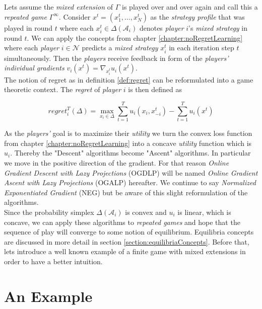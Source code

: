 Lets assume the \textit{mixed extension} of $\Gamma$ is played over and over again and call this a \textit{repeated game} $\Gamma^{\infty}$. Consider $x^t = (x_{1}^{t},\dots,x_{N}^{t})$ as the \textit{strategy profile} that was played in round $t$ where each $x_{i}^{t} \in \Delta(\mathcal{A}_i)$ denotes \textit{player} $i$'s \textit{mixed strategy} in round $t$. We can apply the concepts from chapter \ref{chapter:noRegretLearning} where each \textit{player} $i \in \mathcal{N}$ predicts a \textit{mixed strategy} $x_{i}^{t}$ in each iteration step $t$ simultaneously. Then the \textit{players} receive feedback in form of the  \textit{players' individual gradients} $v_{i}(x^t) = \nabla_{x_{i}^{t}}u_{i}(x^t)$. \\

The notion of regret as in definition \ref{def:regret} can be reformulated into a game theoretic context. The \textit{regret} of \textit{player} $i$ is then defined as

\begin{equation*}
    regret_{i}^{T}(\Delta) = \max_{x_i \in \Delta}\sum_{t=1}^{T} u_i(x_i,x_{-i}^{t}) - \sum_{t=1}^{T}u_i(x^t)
\end{equation*}

As the \textit{players'} goal is to maximize their \textit{utility} we turn the convex loss function from chapter \ref{chapter:noRegretLearning} into a concave \textit{utility} function which is $u_i$. Thereby the "Descent" algorithms become "Ascent" algorithms. In particular we move in the positive direction of the gradient. For that reason \textit{Online Gradient Descent with Lazy Projections} (OGDLP) will be named \textit{Online Gradient Ascent with Lazy Projections} (OGALP) hereafter. We continue to say \textit{Normalized Exponentiated Gradient} (NEG) but be aware of this slight reformulation of the algorithms. \\

Since the probability simplex $\Delta(\mathcal{A}_i)$ is convex and $u_i$ is linear, which is concave, we can apply these algorithms to \textit{repeated games} and hope that the sequence of play will converge to some notion of equilibrium. Equilibria concepts are discussed in more detail in section \ref{section:equilibriaConcepts}. Before that, lets introduce a well known example of a finite game with mixed extensions in order to have a better intuition. 


\section{An Example}\label{section:anExample}

